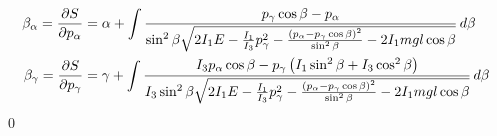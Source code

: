 \documentclass[]{article}
\numberwithin{equation}{section}
\begin{document}
\begin{enumerate}
\begin{align}
		\beta_\alpha = \dfrac{\partial S}{\partial p_\alpha} &= \alpha + \int \frac{p_\gamma \cos\beta - p_\alpha}{\sin^2\beta \sqrt{2 I_1 E - \frac{I_1}{I_3} p_\gamma^2 - \frac{\left(p_\alpha - p_\gamma \cos\beta\right)^2}{\sin^2\beta} - 2 I_1 m g l\cos\beta }} \, d\beta\\
		\beta_\gamma = \dfrac{\partial S}{\partial p_\gamma} &= \gamma + \int \frac{I_3 p_\alpha \cos\beta - p_\gamma \left(I_1 \sin^2\beta + I_3 \cos^2\beta\right)}{I_3 \sin^2\beta \sqrt{2 I_1 E - \frac{I_1}{I_3} p_\gamma^2 - \frac{\left(p_\alpha - p_\gamma \cos\beta\right)^2}{\sin^2\beta} - 2 I_1 m g l\cos\beta }} \, d\beta
	\end{align}
	\qed
\end{enumerate}
\end{document}
